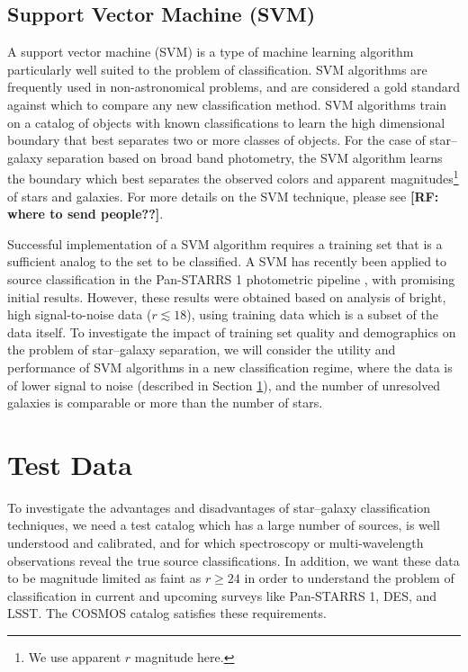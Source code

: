 \documentclass[12pt,preprint]{aastex}
\newcommand\rf[1]{{\bf [RF: #1]}}
\begin{document}
\subsection{Support Vector Machine (SVM)}
\label{ssec:SVMmethod}

A support vector machine (SVM) is a type of machine learning algorithm
particularly well suited to the problem of classification.  SVM
algorithms are frequently used in non-astronomical problems, and are
considered a gold standard against which to compare any new
classification method.  SVM algorithms train on a catalog of objects
with known classifications to learn the high dimensional boundary that
best separates two or more classes of objects.
For the case of star--galaxy separation based on broad band photometry,
the SVM algorithm learns the boundary which best separates the
observed colors and apparent magnitudes\footnote{We use apparent $r$
  magnitude here.} of stars and galaxies.  For more details on the SVM 
  technique, please see \rf{where to send people??}.

Successful implementation of a SVM algorithm requires a training set
that is a sufficient analog to the set to be classified.  A SVM has
recently been applied to source classification in the Pan-STARRS 1
photometric pipeline \citep{saglia12}, with promising initial
results. However, these results were obtained based on analysis of 
bright, high signal-to-noise data ($r\lesssim18$), using training data 
which is a subset of the data itself.
To investigate the impact of training set quality and demographics on
the problem of star--galaxy separation, we will consider the utility
and performance of SVM algorithms in a new classification regime,
where the data is of lower signal to noise (described in Section
\ref{sec:data}), and the number of unresolved galaxies is comparable
or more than the number of stars.

\section{Test Data}
\label{sec:data}

To investigate the advantages and disadvantages of star--galaxy
classification techniques, we need a test catalog which has a large
number of sources, is well understood and calibrated, and for
which spectroscopy or multi-wavelength observations reveal the true
source classifications.  In addition, we want these data to be
magnitude limited as faint as $r\ge24$ in order to understand the
problem of classification in current and upcoming surveys like
Pan-STARRS 1, DES, and LSST.  The COSMOS catalog satisfies these
requirements.   
\end{document}
